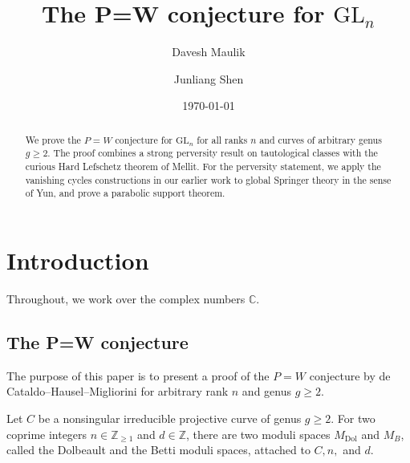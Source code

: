 \documentclass[11pt]{amsart}
\theoremstyle{plain}
\theoremstyle{definition}
\theoremstyle{remark}
\newcommand{\BC}{{\mathbb{C}}}
\newcommand{\BZ}{{\mathbb{Z}}}
\begin{document}
\title[The P=W conjecture for $\mathrm{GL}_n$]{The P=W conjecture for $\mathrm{GL}_n$}
\date{\today}

\author[D. Maulik]{Davesh Maulik}
\address{Massachusetts Institute of Technology}


\author[J. Shen]{Junliang Shen}
\address{Yale University}



\begin{abstract}
We prove the $P=W$ conjecture for $\mathrm{GL}_n$ for all ranks $n$ and curves of arbitrary genus $g\geq 2$.  The proof combines a strong perversity result on tautological classes with the curious Hard Lefschetz theorem of Mellit. For the perversity statement, we apply the vanishing cycles constructions in our earlier work to global Springer theory in the sense of Yun, and prove a parabolic support theorem.

\end{abstract}

\baselineskip=14.5pt
\maketitle

\setcounter{tocdepth}{1} 

\tableofcontents
\setcounter{section}{-1}



\section{Introduction}

Throughout, we work over the complex numbers $\BC$. 

\subsection{The P=W conjecture}
The purpose of this paper is to present a proof of the $P=W$ conjecture by de Cataldo--Hausel--Migliorini \cite{dCHM1} for arbitrary rank $n$ and genus $g \geq 2$.

Let $C$ be a nonsingular irreducible projective curve of genus $g \geq 2$. For two coprime integers $n \in \BZ_{\geq 1}$ and $d \in \BZ$, there are two moduli spaces $M_{\mathrm{Dol}}$ and $M_B$, called the Dolbeault and the Betti moduli spaces, attached to $C,n,$ and $d$. 
\end{document}
